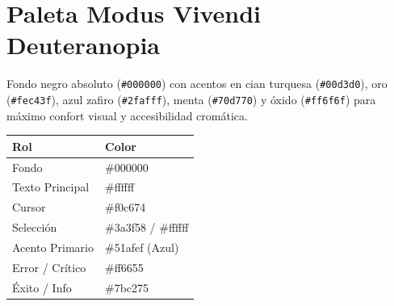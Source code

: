 \documentclass[11pt,article,spanish]{apuntes-scr}
\begin{document}
\section{Paleta Modus Vivendi Deuteranopia}
Fondo negro absoluto (\texttt{\#000000}) con acentos en cian turquesa (\texttt{\#00d3d0}), oro (\texttt{\#fec43f}), azul zafiro (\texttt{\#2fafff}), menta (\texttt{\#70d770}) y óxido (\texttt{\#ff6f6f}) para máximo confort visual y accesibilidad cromática.

\begin{center}
\small
\begin{tabularx}{\linewidth}{l l}
\toprule
\textbf{Rol} & \textbf{Color} \\
\midrule
Fondo & \#000000 \\
Texto Principal & \#ffffff \\
Cursor & \#f0c674 \\
Selección & \#3a3f58 / \#ffffff \\
Acento Primario & \#51afef (Azul) \\
Error / Crítico & \#ff6655 \\
Éxito / Info & \#7bc275 \\
\bottomrule
\end{tabularx}
\end{center}

\backmatter
\end{document}
